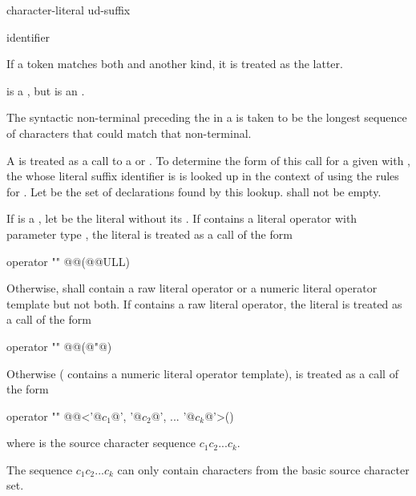\begin{bnf}
\br
    character-literal ud-suffix
\end{bnf}

\begin{bnf}
\br
    identifier
\end{bnf}

\pnum
If a token matches both  and another  kind, it
is treated as the latter.
\begin{example}
is a , but  is an
.
\end{example}
The syntactic non-terminal preceding the  in a
 is taken to be the longest sequence of
characters that could match that non-terminal.

\pnum
A  is treated as a call to a  or
. To determine the form of this call for a
given   with  ,
the  whose literal suffix identifier is  is
looked up in the context of  using the rules for . Let  be the set of declarations found by
this lookup.  shall not be empty.

\pnum
If  is a , let  be the literal
without its . If  contains a literal operator with
parameter type , the literal  is treated as a call of
the form
\begin{codeblock}
operator "" @@(@@ULL)
\end{codeblock}
Otherwise,  shall contain a raw literal operator
or a numeric literal operator template but not both.
If  contains a raw literal operator,
the literal  is treated as a call of the form
\begin{codeblock}
operator "" @@(@"@)
\end{codeblock}
Otherwise ( contains a numeric literal operator template),
 is treated as a call of the form
\begin{codeblock}
operator "" @@<'@$c_1$@', '@$c_2$@', ... '@$c_k$@'>()
\end{codeblock}
where  is the source character sequence $c_1c_2...c_k$.
\begin{note}
The sequence
$c_1c_2...c_k$ can only contain characters from the basic source character set.
\end{note}

